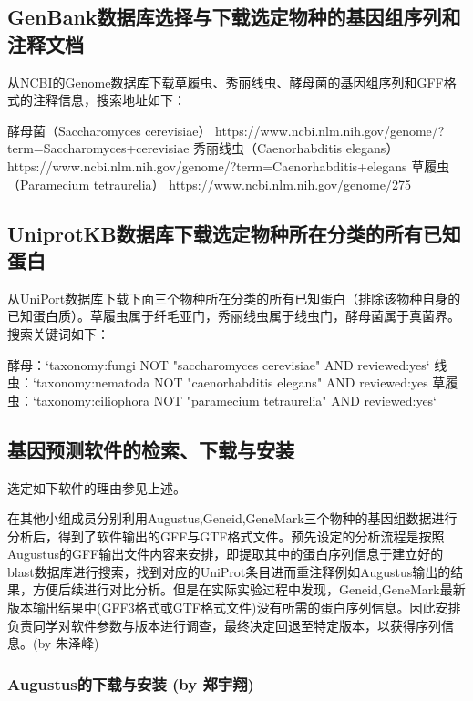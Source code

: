 \documentclass[12pt]{ctexart}
\begin{document}
\subsection{GenBank数据库选择与下载选定物种的基因组序列和注释文档}

从NCBI的Genome数据库下载草履虫、秀丽线虫、酵母菌的基因组序列和GFF格式的注释信息，搜索地址如下：

\begin{outline}[enumerate]
\1 酵母菌（Saccharomyces cerevisiae）
\2 https://www.ncbi.nlm.nih.gov/genome/?term=Saccharomyces+cerevisiae
\1 秀丽线虫（Caenorhabditis elegans）
\2 https://www.ncbi.nlm.nih.gov/genome/?term=Caenorhabditis+elegans
\1 草履虫（Paramecium tetraurelia）
\2 https://www.ncbi.nlm.nih.gov/genome/275
\end{outline}

\subsection{UniprotKB数据库下载选定物种所在分类的所有已知蛋白}

从UniPort数据库下载下面三个物种所在分类的所有已知蛋白（排除该物种自身的已知蛋白质）。草履虫属于纤毛亚门，秀丽线虫属于线虫门，酵母菌属于真菌界。搜索关键词如下：

\begin{outline}[enumerate]
\1 酵母：`taxonomy:fungi NOT "saccharomyces cerevisiae" AND reviewed:yes`
\1 线虫：`taxonomy:nematoda NOT "caenorhabditis elegans" AND reviewed:yes
\1 草履虫：`taxonomy:ciliophora NOT "paramecium tetraurelia" AND reviewed:yes`
\end{outline}

\subsection{基因预测软件的检索、下载与安装}

选定如下软件的理由参见上述。

在其他小组成员分别利用Augustus,Geneid,GeneMark三个物种的基因组数据进行分析后，得到了软件输出的GFF与GTF格式文件。预先设定的分析流程是按照Augustus的GFF输出文件内容来安排，即提取其中的蛋白序列信息于建立好的blast数据库进行搜索，找到对应的UniProt条目进而重注释例如Augustus输出的结果，方便后续进行对比分析。但是在实际实验过程中发现，Geneid,GeneMark最新版本输出结果中(GFF3格式或GTF格式文件)没有所需的蛋白序列信息。因此安排负责同学对软件参数与版本进行调查，最终决定回退至特定版本，以获得序列信息。(by 朱泽峰)

\subsubsection{Augustus的下载与安装 (by 郑宇翔)}
\end{document}
